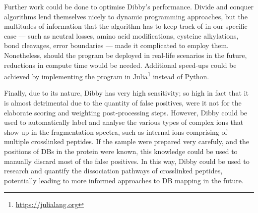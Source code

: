 Further work could be done to optimise Dibby's performance. Divide and conquer algorithms lend themselves nicely to dynamic programming approaches, but the multitudes of information that the algorithm has to keep track of in our specific case --- such as neutral losses, amino acid modifications, cysteine alkylations, bond cleavages, error boundaries --- made it complicated to employ them. Nonetheless, should the program be deployed in real-life scenarios in the future, reductions in compute time would be needed. Additional speed-ups could be achieved by implementing the program in Julia\footnote{\url{https://julialang.org}} instead of Python.

Finally, due to its nature, Dibby has very high sensitivity; so high in fact that it is almost detrimental due to the quantity of false positives, were it not for the elaborate scoring and weighting post-processing steps. However, Dibby could be used to automatically label and analyse the various types of complex ions that show up in the fragmentation spectra, such as internal ions comprising of multiple crosslinked peptides. If the sample were prepared very carefuly, and the positions of DBs in the protein were known, this knowledge could be used to manually discard most of the false positives. In this way, Dibby could be used to research and quantify the dissociation pathways of crosslinked peptides, potentially leading to more informed approaches to DB mapping in the future.